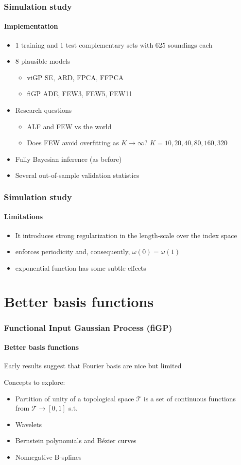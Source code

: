 \documentclass{snedecorbeamer}
\begin{document}
\begin{frame}
  \frametitle{Simulation study}
  \framesubtitle{Implementation}

  \begin{itemize}
  \item 1 training and 1 test complementary sets with 625 soundings each
  \item 8 plausible models
    \begin{itemize}
    \item viGP SE, ARD, FPCA, FFPCA
    \item fiGP ADE, FEW3, FEW5, FEW11
    \end{itemize}
  \item Research questions
    \begin{itemize}
    \item ALF and FEW vs the world
    \item Does FEW avoid overfitting as $K\to\infty$?
      $K = 10, 20, 40, 80, 160, 320$
    \end{itemize}
  \item Fully Bayesian inference (as before)
  \item Several out-of-sample validation statistics
    \hyperlink{frm:validation}{}
  \end{itemize}
\end{frame}

\begin{frame}
  \frametitle{Simulation study}
  \framesubtitle{Limitations}

  \begin{itemize}
  \item It introduces strong regularization in the length-scale over the index
    space
  \item enforces periodicity and, consequently, $\omega(0) = \omega(1)$
  \item exponential function has some subtle effects
  \end{itemize}

\end{frame}

\section{Better basis functions}

\begin{frame}
  \frametitle{Functional Input Gaussian Process (fiGP)}
  \framesubtitle{Better basis functions}
  Early results suggest that Fourier basis are nice but limited

  Concepts to explore:
  \begin{itemize}
  \item Partition of unity of a topological space $\mathcal{T}$ is a set of
    continuous functions from $\mathcal{T}\to[0, 1]$ s.t.
  \item Wavelets
  \item Bernstein polynomials and Bézier curves
  \item Nonnegative B-splines
  \end{itemize}
\end{frame}
\end{document}
